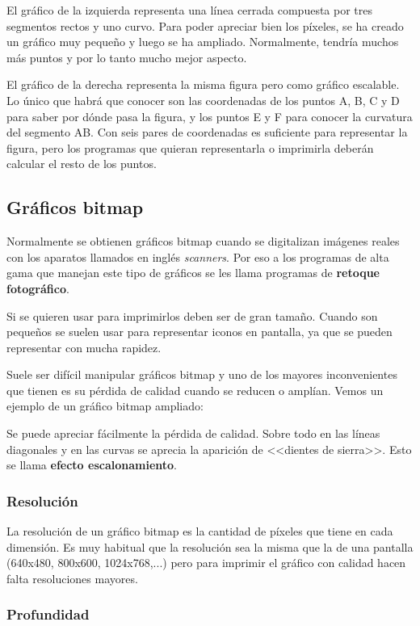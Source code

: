 El gráfico de la izquierda representa una línea cerrada compuesta por
tres segmentos rectos y uno curvo. Para poder apreciar bien los
píxeles, se ha creado un gráfico muy pequeño y luego se ha
ampliado. Normalmente, tendría muchos más puntos y por lo tanto mucho
mejor aspecto.

El gráfico de la derecha representa la misma figura pero como gráfico
escalable. Lo único que habrá que conocer son las coordenadas de los
puntos A, B, C y D para saber por dónde pasa la figura, y los puntos E
y F para conocer la curvatura del segmento AB. Con seis pares de
coordenadas es suficiente para representar la figura, pero los
programas que quieran representarla o imprimirla deberán calcular el
resto de los puntos.

\subsection{Gráficos bitmap}

Normalmente se obtienen gráficos bitmap cuando se digitalizan imágenes
reales con los aparatos llamados en inglés \emph{scanners}. Por eso a
los programas de alta gama que manejan este tipo de gráficos se les
llama programas de \textbf{retoque fotográfico}.

Si se quieren usar para imprimirlos deben ser de gran tamaño. Cuando
son pequeños se suelen usar para representar iconos en pantalla, ya
que se pueden representar con mucha rapidez.

Suele ser difícil manipular gráficos bitmap y uno de los mayores
inconvenientes que tienen es su pérdida de calidad cuando se reducen o
amplían. Vemos un ejemplo de un gráfico bitmap ampliado:

Se puede apreciar fácilmente la pérdida de calidad. Sobre todo en las
líneas diagonales y en las curvas se aprecia la aparición de <<dientes
de sierra>>. Esto se llama \textbf{efecto escalonamiento}.

\subsubsection{Resolución}

La resolución de un gráfico bitmap es la cantidad de píxeles que tiene
en cada dimensión. Es muy habitual que la resolución sea la misma que
la de una pantalla (640x480, 800x600, 1024x768,...) pero para imprimir
el gráfico con calidad hacen falta resoluciones mayores.

\subsubsection{Profundidad}

